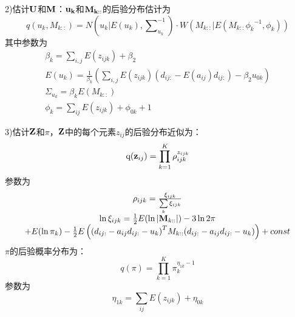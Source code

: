 2)估计$\bf{U}$和$\bf{M}$：$\bf{u_k}$和$\bf{M_{k::}}$的后验分布估计为
\begin{equation}
    \label{equ:append:EUM}
    q({u_k},{M_{k::}}) = N({u_k}|E({u_k}),\sum\nolimits_{{u_k}}^{ - 1} {} ) \cdot W({M_{k::}}|E({M_{k::}}{\phi _k}^{ - 1},{\phi _k}))
\end{equation}
其中参数为
\begin{equation}
    \label{equ:append:EUMParam}
        \begin{array}{*{20}{c}}
        {{\beta _k} = \sum\limits_{i,j} {E({z_{ijk}}) + {\beta _2}} }\\
        {E({u_k}) = \frac{1}{{{\beta _k}}}\left( {\sum\limits_{i,j} {E({z_{ijk}})({d_{ij:}} - E({a_{ij}}){d_{ij:}}) - {\beta _2}{u_{0k}}} } \right)}\\
        {{\Sigma _{{u_k}}} = {\beta _k}E({M_{k::}})}\\
        {{\phi _k} = \sum\limits_{ij} {E({z_{ijk}}) + {\phi _{0k}} + 1} }
        \end{array}
\end{equation}

3)估计$\bf{Z}$和$\pi$，$\bf{Z}$中的每个元素$z_{ij}$的后验分布近似为：
\begin{equation}
    \label{equ:append:zpiE}
    {\rm{q}}({{\bf{z}}_{ij}}) = \prod\limits_{k = 1}^K {\rho _{ijk}^{{z_{ijk}}}} 
\end{equation}
参数为
\begin{equation}
    \begin{aligned}
    \begin{array}{*{20}{c}}
    {{\rho _{ijk}} = \frac{{{\xi _{ijk}}}}{{\sum\limits_k {{\xi _{ijk}}} }}}\\
    {\ln {\xi _{ijk}} = \frac{1}{2}E(\ln \left| {{{\bf{M}}_{k::}}} \right|) - 3\ln 2\pi}\\{+ E(\ln {\pi _k}) - \frac{1}{2}E\left( {{{({d_{ij:}} - {a_{ij}}{d_{ij:}} - {u_k})}^T}{M_{k::}}({d_{ij:}} - {a_{ij}}{d_{ij:}} - {u_k})} \right) + const}
    \end{array}
    \end{aligned}
\end{equation}
$\pi$的后验概率分布为：
\begin{equation}
    \label{equ:append:piEU}
    q(\pi ) = \prod\limits_{k = 1}^K {\pi _k^{{\eta _{1k}} - 1}} 
\end{equation}
参数为
\begin{equation}
    {\eta _{1k}} = \sum\limits_{ij} {E({z_{ijk}}) + {\eta _{0k}}}
\end{equation}
